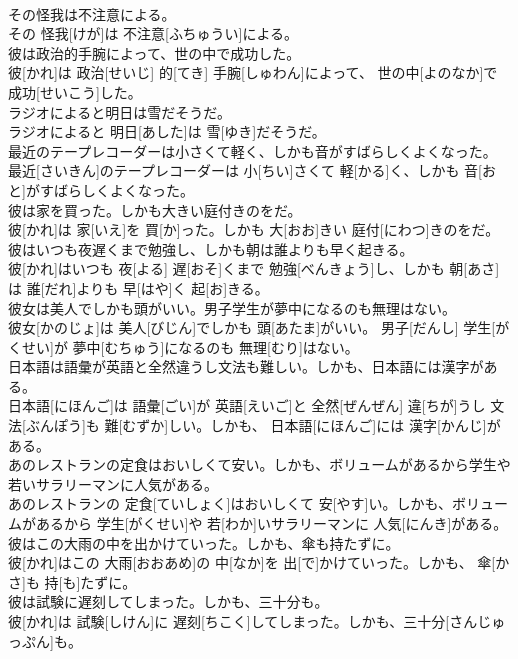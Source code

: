\documentclass[8pt]{extreport}
\begin{document}
\begin{CJK}{UTF8}{min}
\\	その怪我は不注意による。	
\\	その 怪我[けが]は 不注意[ふちゅうい]による。
\\	彼は政治的手腕によって、世の中で成功した。	
\\	彼[かれ]は 政治[せいじ] 的[てき] 手腕[しゅわん]によって、 世の中[よのなか]で 成功[せいこう]した。
\\	ラジオによると明日は雪だそうだ。	
\\	ラジオによると 明日[あした]は 雪[ゆき]だそうだ。
\\	最近のテープレコーダーは小さくて軽く、しかも音がすばらしくよくなった。	
\\	最近[さいきん]のテープレコーダーは 小[ちい]さくて 軽[かる]く、しかも 音[おと]がすばらしくよくなった。
\\	彼は家を買った。しかも大きい庭付きのをだ。	
\\	彼[かれ]は 家[いえ]を 買[か]った。しかも 大[おお]きい 庭付[にわつ]きのをだ。
\\	彼はいつも夜遅くまで勉強し、しかも朝は誰よりも早く起きる。	
\\	彼[かれ]はいつも 夜[よる] 遅[おそ]くまで 勉強[べんきょう]し、しかも 朝[あさ]は 誰[だれ]よりも 早[はや]く 起[お]きる。
\\	彼女は美人でしかも頭がいい。男子学生が夢中になるのも無理はない。	
\\	彼女[かのじょ]は 美人[びじん]でしかも 頭[あたま]がいい。 男子[だんし] 学生[がくせい]が 夢中[むちゅう]になるのも 無理[むり]はない。
\\	日本語は語彙が英語と全然違うし文法も難しい。しかも、日本語には漢字がある。	
\\	日本語[にほんご]は 語彙[ごい]が 英語[えいご]と 全然[ぜんぜん] 違[ちが]うし 文法[ぶんぽう]も 難[むずか]しい。しかも、 日本語[にほんご]には 漢字[かんじ]がある。
\\	あのレストランの定食はおいしくて安い。しかも、ボリュームがあるから学生や若いサラリーマンに人気がある。	
\\	あのレストランの 定食[ていしょく]はおいしくて 安[やす]い。しかも、ボリュームがあるから 学生[がくせい]や 若[わか]いサラリーマンに 人気[にんき]がある。
\\	彼はこの大雨の中を出かけていった。しかも、傘も持たずに。	
\\	彼[かれ]はこの 大雨[おおあめ]の 中[なか]を 出[で]かけていった。しかも、 傘[かさ]も 持[も]たずに。
\\	彼は試験に遅刻してしまった。しかも、三十分も。	
\\	彼[かれ]は 試験[しけん]に 遅刻[ちこく]してしまった。しかも、三十分[さんじゅっぷん]も。

\end{CJK}
\end{document}
